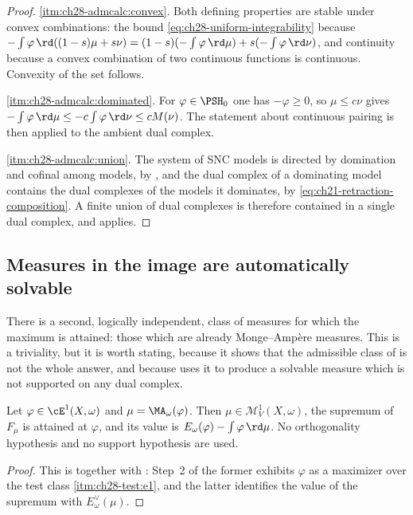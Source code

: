 \begin{proof}
\cref{itm:ch28-admcalc:convex}.  Both defining properties are stable under
convex combinations: the bound \eqref{eq:ch28-uniform-integrability} because
$-\int\varphi\,\rd((1-s)\mu+s\nu)=(1-s)(-\int\varphi\,\rd\mu)
+s(-\int\varphi\,\rd\nu)$, and continuity because a convex combination of
two continuous functions is continuous.  Convexity of the set follows.

\cref{itm:ch28-admcalc:dominated}.  For $\varphi\in\PSH_0$ one has
$-\varphi\geq0$, so $\mu\leq c\nu$ gives
$-\int\varphi\,\rd\mu\leq-c\int\varphi\,\rd\nu\leq cM(\nu)$.  The
statement about continuous pairing is then
 applied to the ambient dual complex.

\cref{itm:ch28-admcalc:union}.  The system of SNC models is directed by
domination and cofinal among models, by , and the
dual complex of a dominating model contains the dual complexes of the models
it dominates, by \eqref{eq:ch21-retraction-composition}.  A finite union of
dual complexes is therefore contained in a single dual complex, and
 applies.
\end{proof}

\subsection{Measures in the image are automatically solvable}
\label{sec:ch28-image-solvable}

There is a second, logically independent, class of measures for which the
maximum is attained: those which are already Monge--Amp\`ere measures.  This
is a triviality, but it is worth stating, because it shows that the
admissible class of  is not the whole
answer, and because  uses it to produce
a solvable measure which is not supported on any dual complex.

\begin{proposition}
\label{prop:ch28-image-is-solvable}
Let $\varphi\in\cE^1(X,\omega)$ and $\mu=\MA_\omega(\varphi)$.  Then
$\mu\in\mathcal M^1_V(X,\omega)$, the supremum of $F_\mu$ is attained at
$\varphi$, and its value is
$E_\omega(\varphi)-\int\varphi\,\rd\mu$.  No orthogonality hypothesis and
no support hypothesis are used.
\end{proposition}

\begin{proof}
This is  together with
: Step~2 of the former exhibits
$\varphi$ as a maximizer over the test class
\cref{itm:ch28-test:e1}, and the latter identifies the value of the supremum
with $E^\vee_\omega(\mu)$.
\end{proof}

